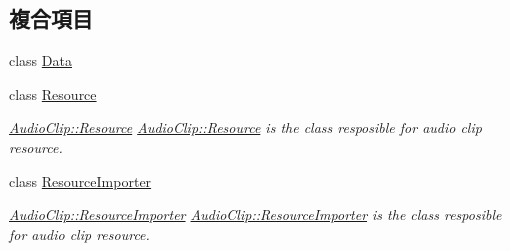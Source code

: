\subsection*{複合項目}
\begin{DoxyCompactItemize}
\item 
class \hyperlink{class_magnum_1_1_audio_clip_1_1_data}{Data}
\item 
class \hyperlink{class_magnum_1_1_audio_clip_1_1_resource}{Resource}
\begin{DoxyCompactList}\small\item\em \hyperlink{class_magnum_1_1_audio_clip_1_1_resource}{Audio\+Clip\+::\+Resource} \hyperlink{class_magnum_1_1_audio_clip_1_1_resource}{Audio\+Clip\+::\+Resource} is the class resposible for audio clip resource. \end{DoxyCompactList}\item 
class \hyperlink{class_magnum_1_1_audio_clip_1_1_resource_importer}{Resource\+Importer}
\begin{DoxyCompactList}\small\item\em \hyperlink{class_magnum_1_1_audio_clip_1_1_resource_importer}{Audio\+Clip\+::\+Resource\+Importer} \hyperlink{class_magnum_1_1_audio_clip_1_1_resource_importer}{Audio\+Clip\+::\+Resource\+Importer} is the class resposible for audio clip resource. \end{DoxyCompactList}\end{DoxyCompactItemize}
